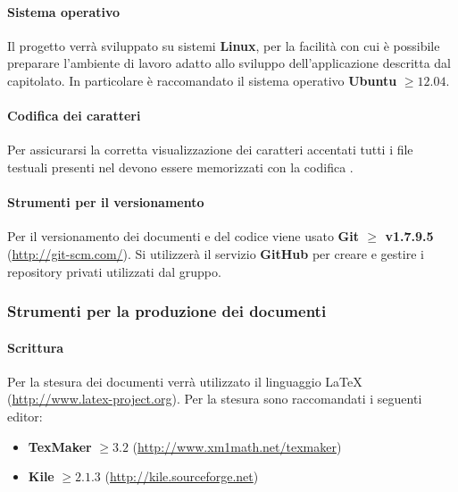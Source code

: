 		\paragraph{Sistema operativo}
		
		Il progetto verrà sviluppato su sistemi \textbf{Linux}, per la facilità con cui è possibile preparare l'ambiente di lavoro adatto allo sviluppo dell'applicazione descritta dal capitolato. In particolare è raccomandato il sistema operativo \textbf{Ubuntu} $\geq 12.04$.
		
		\paragraph{Codifica dei caratteri}
		
		Per assicurarsi la corretta visualizzazione dei caratteri accentati tutti i file testuali presenti nel  devono essere memorizzati con la codifica \textbf{}.
		
		\paragraph{Strumenti per il versionamento}
		\label{github}
		
		Per il versionamento dei documenti e del codice viene usato \textbf{Git $\ge$ v1.7.9.5} (\url{http://git-scm.com/}).
		Si utilizzerà il servizio \textbf{GitHub} per creare e gestire i repository privati utilizzati dal gruppo.
		
		
	\subsubsection{Strumenti per la produzione dei documenti}
	
		\paragraph{Scrittura}
		
		Per la stesura dei documenti verrà utilizzato il linguaggio \LaTeX{} (\url{http://www.latex-project.org}).
		Per la stesura sono raccomandati i seguenti editor:
		\begin{itemize}
		 \item \textbf{TexMaker} $\geq 3.2$ (\url{http://www.xm1math.net/texmaker})
		 \item \textbf{Kile} $\geq 2.1.3$ (\url{http://kile.sourceforge.net})
		\end{itemize}
		
